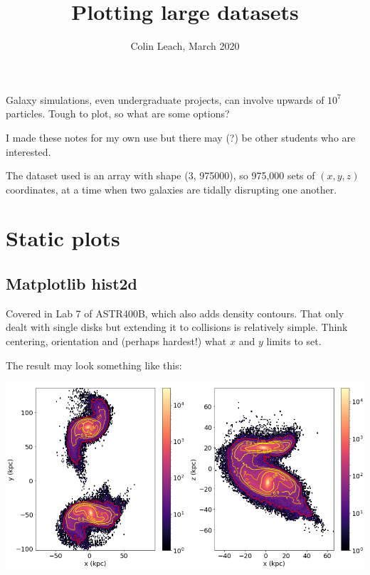 

\setlength{\parskip}{0.2em}
\setlength{\skip\footins}{20pt}

\title{Plotting large datasets}
\author{Colin Leach, March 2020}
\date{\vspace{-3ex}}



	
\maketitle

Galaxy simulations, even undergraduate projects, can involve upwards of $10^7$ particles. Tough to plot, so what are some options?

I made these notes for my own use but there may (?) be other students who are interested.

The dataset used is an array with shape (3, 975000), so 975,000 sets of $(x,y,z)$ coordinates, at a time when two galaxies are tidally disrupting one another.

\section{Static plots}

\subsection{Matplotlib hist2d}

Covered in Lab 7 of ASTR400B, which also adds density contours. That only dealt with single disks but extending it to collisions is relatively simple. Think centering, orientation and (perhaps hardest!) what $x$ and $y$ limits to set.

The result may look something like this:

{\centering \includegraphics[scale=0.5]{mpl contours, 400b code} \par}

